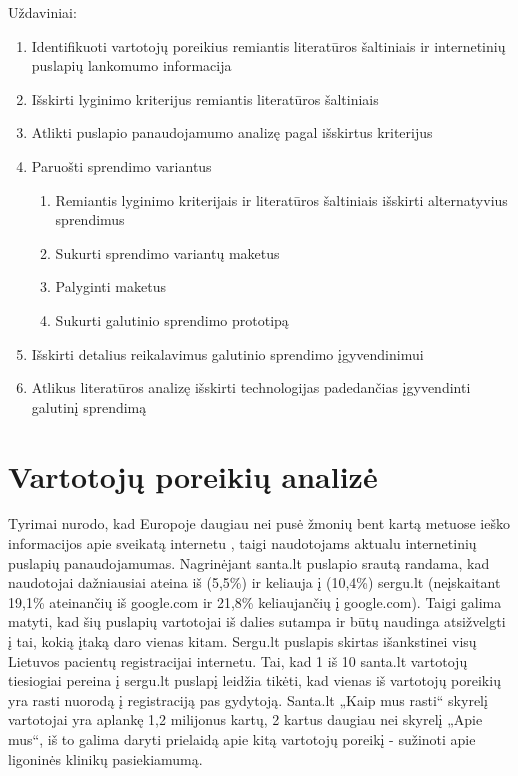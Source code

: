 \documentclass{VUMIFPSkursinis}
\begin{document}
Uždaviniai:
\begin{enumerate}
	\item Identifikuoti vartotojų poreikius remiantis literatūros šaltiniais ir internetinių puslapių lankomumo informacija
	\item Išskirti lyginimo kriterijus remiantis literatūros šaltiniais
	\item Atlikti puslapio panaudojamumo analizę pagal išskirtus kriterijus
	\item Paruošti sprendimo variantus
	\renewcommand*{\theenumii}{\theenumi.\arabic{enumii}}
	\renewcommand{\labelenumii}{\theenumii}
	\begin{enumerate}
		\item Remiantis lyginimo kriterijais ir literatūros šaltiniais išskirti alternatyvius sprendimus
		\item Sukurti sprendimo variantų maketus
		\item Palyginti maketus
		\item Sukurti galutinio sprendimo prototipą
	\end{enumerate}
	\item Išskirti detalius reikalavimus galutinio sprendimo įgyvendinimui
	\item Atlikus literatūros analizę išskirti technologijas padedančias įgyvendinti galutinį sprendimą
\end{enumerate}



\section{Vartotojų poreikių analizė}
Tyrimai nurodo, kad Europoje daugiau nei pusė žmonių bent kartą metuose ieško informacijos apie sveikatą internetu \cite{EuCitizDigHealthEn}, taigi naudotojams aktualu internetinių puslapių panaudojamumas. Nagrinėjant santa.lt puslapio srautą randama, kad naudotojai dažniausiai ateina iš (5,5\%) ir keliauja į (10,4\%) sergu.lt (neįskaitant 19,1\% ateinančių iš google.com ir 21,8\% keliaujančių į google.com)\cite{AlexaSantaEn}. Taigi galima matyti, kad šių puslapių vartotojai iš dalies sutampa ir būtų naudinga atsižvelgti į tai, kokią įtaką daro vienas kitam. Sergu.lt puslapis skirtas išankstinei visų Lietuvos pacientų registracijai internetu. Tai, kad 1 iš 10 santa.lt vartotojų tiesiogiai pereina į sergu.lt puslapį leidžia tikėti, kad vienas iš vartotojų poreikių yra rasti nuorodą į registraciją pas gydytoją. Santa.lt „Kaip mus rasti“ skyrelį vartotojai yra aplankę 1,2 milijonus kartų\cite{VulSkKaipMusRastiLt}, 2 kartus daugiau nei skyrelį „Apie mus“\cite{VulSkApieMusLt}, iš to galima daryti prielaidą apie kitą vartotojų poreikį - sužinoti apie ligoninės klinikų pasiekiamumą.
\end{document}
